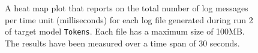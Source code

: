 \begin{figure}[htbp]
\centering
\begin{minipage}{1\textwidth}
  \centering
\end{minipage}
\caption{A heat map plot that reports on the total number of log messages per time unit (milliseconds) for each log file generated during run 2 of target model \texttt{Tokens}. Each file has a maximum size of 100MB. The results have been measured over a time span of 30 seconds.}
\label{figure:throughput_sum_tokens_2}
\end{figure}
